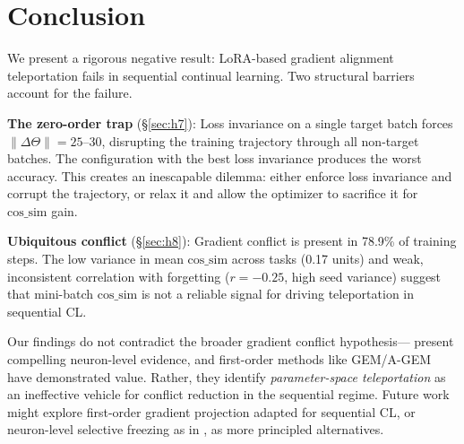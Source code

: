 \documentclass{article}
\newcommand{\cossim}{\mathrm{cos\_sim}}
\begin{document}
\section{Conclusion}
\label{sec:conclusion}

We present a rigorous negative result: LoRA-based gradient alignment teleportation fails
in sequential continual learning.
Two structural barriers account for the failure.

\textbf{The zero-order trap} (\S\ref{sec:h7}): Loss invariance on a single target batch forces
$\|\Delta\Theta\| = 25$--$30$, disrupting the training trajectory through all non-target batches.
The configuration with the best loss invariance produces the worst accuracy.
This creates an inescapable dilemma: either enforce loss invariance and corrupt the trajectory,
or relax it and allow the optimizer to sacrifice it for $\cossim$ gain.

\textbf{Ubiquitous conflict} (\S\ref{sec:h8}): Gradient conflict is present in 78.9\% of
training steps. The low variance in mean $\cossim$ across tasks (0.17 units) and weak,
inconsistent correlation with forgetting ($r = -0.25$, high seed variance) suggest that
mini-batch $\cossim$ is not a reliable signal for driving teleportation in sequential CL.

Our findings do not contradict the broader gradient conflict hypothesis---\citet{liu2026gradconflict}
present compelling neuron-level evidence, and first-order methods like GEM/A-GEM have demonstrated
value. Rather, they identify \emph{parameter-space teleportation} as an ineffective vehicle
for conflict reduction in the sequential regime. Future work might explore first-order gradient
projection adapted for sequential CL, or neuron-level selective freezing as in \citet{liu2026gradconflict},
as more principled alternatives.



\end{document}
